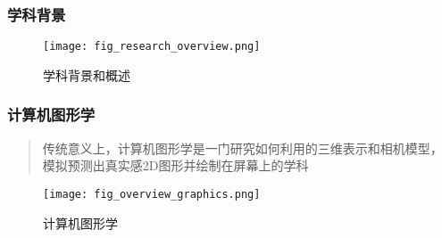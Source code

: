 \begin{frame}
    \frametitle{学科背景}
    \begin{figure}[H]
        \centering
        \texttt{[image: fig\_research\_overview.png]}
        \caption{学科背景和概述}
        \label{fig:research_overview}
    \end{figure}
\end{frame}

\begin{frame}
    \frametitle{计算机图形学}
    \begin{quote}
        传统意义上，计算机图形学是一门研究如何利用的三维表示和相机模型，
        模拟预测出真实感2D图形并绘制在屏幕上的学科
    \end{quote}
    \begin{figure}[H]
        \centering
        \texttt{[image: fig\_overview\_graphics.png]}
        \caption{计算机图形学}
        \label{fig:graphics_overview}
    \end{figure}
\end{frame}




